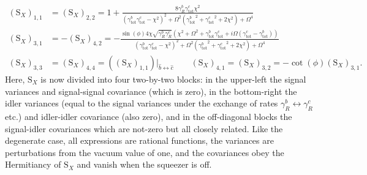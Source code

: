 {\small
\begin{align}\label{eq:nOPO_full_freedom}
(\text{S}_X)_{1,1}&=(\text{S}_X)_{2,2}=1+\frac{8 \gamma^b_R {\gamma^c_\text{tot}} \chi ^2}{\left({\gamma^b_\text{tot}} {\gamma^c_\text{tot}}-\chi ^2\right)^2+\Omega ^2 \left({\gamma^b_\text{tot}}^2+{\gamma^c_\text{tot}}^2+2 \chi ^2\right)+\Omega ^4}\\
(\text{S}_X)_{3,1}&=-(\text{S}_X)_{4,2}= -\frac{\sin (\phi )4 \chi  \sqrt{\gamma^b_R \gamma^c_R}  \left(\chi ^2+\Omega^2+\gamma^b_\text{tot}\gamma^c_\text{tot}+i\Omega\left(\gamma^c_\text{tot}-\gamma^b_\text{tot}\right)\right)}{\left({\gamma^b_\text{tot}} {\gamma^c_\text{tot}}-\chi ^2\right)^2+\Omega ^2 \left({\gamma^b_\text{tot}}^2+{\gamma^c_\text{tot}}^2+2 \chi ^2\right)+\Omega ^4}\nonumber\\
(\text{S}_X)_{3,3}&=(\text{S}_X)_{4,4}=\left((\text{S}_X)_{1,1}\right)|_{\hat{b}\leftrightarrow \hat{c}}\qquad (\text{S}_X)_{4,1}=(\text{S}_X)_{3,2}= -\cot(\phi)(\text{S}_X)_{3,1}\nonumber.
\end{align}}%
Here, $\text{S}_X$ is now divided into four two-by-two blocks: in the upper-left the signal variances and signal-signal covariance (which is zero), in the bottom-right the idler variances (equal to the signal variances under the exchange of rates $\gamma^b_R\leftrightarrow\gamma^c_R$ etc.) and idler-idler covariance (also zero), and in the off-diagonal blocks the signal-idler covariances which are not-zero but all closely related. Like the degenerate case, all expressions are rational functions, the variances are perturbations from the vacuum value of one, and the covariances obey the Hermitiancy of $\text{S}_X$ and vanish when the squeezer is off. 

\label{sec:nOPO_results}

